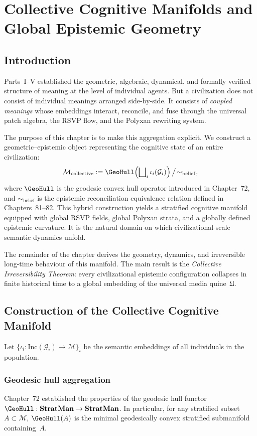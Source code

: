 \chapter{Collective Cognitive Manifolds and Global Epistemic Geometry}
\label{ch:collective-cognitive-manifolds}

\section{Introduction}

Parts~I--V established the geometric, algebraic, dynamical, and
formally verified structure of meaning at the level of individual
agents.
But a civilization does not consist of individual meanings arranged
side-by-side.
It consists of \emph{coupled meanings} whose embeddings interact,
reconcile, and fuse through the universal patch algebra, the RSVP flow,
and the Polyxan rewriting system.

The purpose of this chapter is to make this aggregation explicit.
We construct a geometric--epistemic object representing the cognitive
state of an entire civilization:
\[
  \mathcal{M}_{\mathrm{collective}}
  := \GeoHull\!\left(\bigsqcup\nolimits_i \iota_i(\mathcal{G}_i)\right)
     \big/ \!\sim_{\mathrm{belief}},
\]
where $\GeoHull$ is the geodesic convex hull operator introduced in
Chapter~72, and $\sim_{\mathrm{belief}}$ is the epistemic reconciliation
equivalence relation defined in Chapters~81--82.
This hybrid construction yields a
stratified cognitive manifold equipped with global RSVP fields,
global Polyxan strata, and a globally defined epistemic curvature.
It is the natural domain on which civilizational-scale semantic
dynamics unfold.

The remainder of the chapter derives the geometry, dynamics, and
irreversible long-time behaviour of this manifold.
The main result is the \emph{Collective Irreversibility Theorem}: every
civilizational epistemic configuration collapses in finite historical
time to a global embedding of the universal media quine~$\mathfrak{U}$.


\section{Construction of the Collective Cognitive Manifold}

Let $\{\iota_i : \mathrm{Inc}(\mathcal{G}_i) \rightarrow \mathcal{M}\}_i$
be the semantic embeddings of all individuals in the population.

\subsection{Geodesic hull aggregation}
Chapter~72 established the properties of the geodesic hull functor
$\GeoHull : \mathbf{StratMan} \rightarrow \mathbf{StratMan}$.
In particular, for any stratified subset $A \subset \mathcal{M}$,
$\GeoHull(A)$ is the minimal geodesically convex stratified submanifold
containing~$A$.

